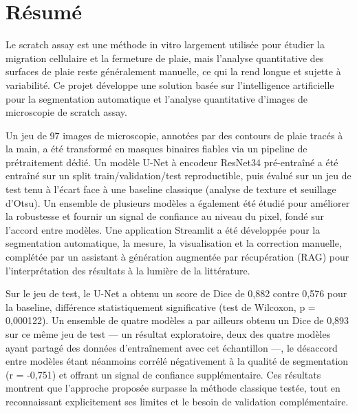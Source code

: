\documentclass[12pt,a4paper]{report}
\begin{document}
\newpage

\chapter*{Résumé}

\noindent
\hspace{1cm}Le scratch assay est une méthode in vitro largement utilisée pour étudier la migration cellulaire et la fermeture de plaie, mais l'analyse quantitative des surfaces de plaie reste généralement manuelle, ce qui la rend longue et sujette à variabilité. Ce projet développe une solution basée sur l'intelligence artificielle pour la segmentation automatique et l'analyse quantitative d'images de microscopie de scratch assay.

\vspace{0.3cm}
\noindent
\hspace{1cm}Un jeu de 97 images de microscopie, annotées par des contours de plaie tracés à la main, a été transformé en masques binaires fiables via un pipeline de prétraitement dédié. Un modèle U-Net à encodeur ResNet34 pré-entraîné a été entraîné sur un split train/validation/test reproductible, puis évalué sur un jeu de test tenu à l'écart face à une baseline classique (analyse de texture et seuillage d'Otsu). Un ensemble de plusieurs modèles a également été étudié pour améliorer la robustesse et fournir un signal de confiance au niveau du pixel, fondé sur l'accord entre modèles. Une application Streamlit a été développée pour la segmentation automatique, la mesure, la visualisation et la correction manuelle, complétée par un assistant à génération augmentée par récupération (RAG) pour l'interprétation des résultats à la lumière de la littérature.

\vspace{0.3cm}
\noindent
\hspace{1cm}Sur le jeu de test, le U-Net a obtenu un score de Dice de 0,882 contre 0,576 pour la baseline, différence statistiquement significative (test de Wilcoxon, p = 0,000122). Un ensemble de quatre modèles a par ailleurs obtenu un Dice de 0,893 sur ce même jeu de test --- un résultat exploratoire, deux des quatre modèles ayant partagé des données d'entraînement avec cet échantillon ---, le désaccord entre modèles étant néanmoins corrélé négativement à la qualité de segmentation (r = -0,751) et offrant un signal de confiance supplémentaire. Ces résultats montrent que l'approche proposée surpasse la méthode classique testée, tout en reconnaissant explicitement ses limites et le besoin de validation complémentaire.
\end{document}

